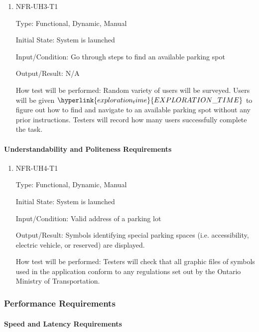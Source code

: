 \documentclass[12pt, titlepage]{article}
\begin{document}
\begin{enumerate}

\item{NFR-UH3-T1}

Type: Functional, Dynamic, Manual
					
Initial State: System is launched
					
Input/Condition: Go through steps to find an available parking spot
					
Output/Result: N/A
					
How test will be performed: Random variety of users will be surveyed. Users will
be given $\hyperlink{exploration_time}{EXPLORATION\_TIME}$ to figure out how to
find and navigate to an available parking spot without any prior instructions.
Testers will record how many users successfully complete the task.
\color{red}{At least 5 users will be surveyed. At least 80\% of users should
successfully complete the task.}
					
\end{enumerate}

\paragraph{Understandability and Politeness Requirements}

\begin{enumerate}

\item{NFR-UH4-T1}

Type: Functional, Dynamic, Manual
					
Initial State: System is launched
					
Input/Condition: Valid address of a parking lot
					
Output/Result: Symbols identifying special parking spaces (i.e. accessibility,
electric vehicle, or reserved) are displayed.
					
How test will be performed: Testers will check that all graphic files of symbols
used in the application conform to any regulations set out by the Ontario
Ministry of Transportation.
					
\end{enumerate}

\subsubsection{Performance Requirements}
\label{sec:5.2.3}
\paragraph{Speed and Latency Requirements}
\end{document}

